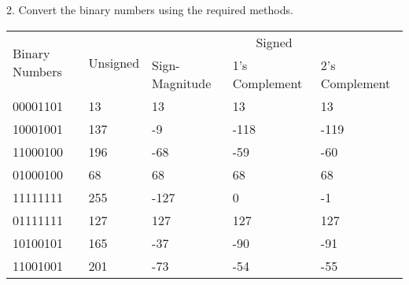 2. Convert the binary numbers using the required methods.
\begin{table}[H]
    \begin{tabularx}{\textwidth}{X|XXXX}
    \multirow{2}{*}{Binary Numbers} & \multirow{2}{*}{Unsigned} & \multicolumn{3}{c}{Signed} \\
     &  & Sign-Magnitude & 1's Complement & 2's Complement \\
    \hline
    00001101 & 13 & 13 & 13 & 13 \\
    10001001 & 137 & -9 & -118 & -119 \\
    11000100 & 196 & -68 & -59 & -60 \\
    01000100 & 68 & 68 & 68 & 68 \\
    11111111 & 255 & -127 & 0 & -1 \\
    01111111 & 127 & 127 & 127 & 127 \\
    10100101 & 165 & -37 & -90 & -91 \\
    11001001 & 201 & -73 & -54 & -55
    \end{tabularx}
\end{table}
